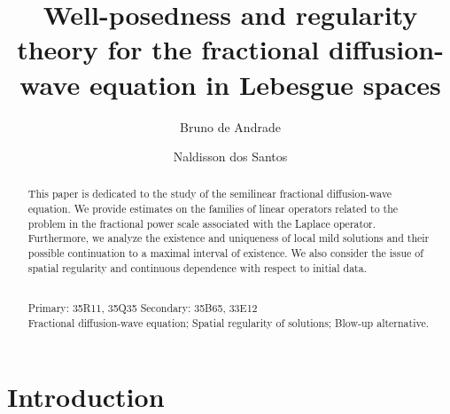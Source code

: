 \documentclass[12pt,reqno]{amsart}
\begin{document}
	
	
	
	\title[ Fractional diffusion-wave equations]{Well-posedness and regularity theory for the fractional diffusion-wave equation in Lebesgue spaces}
	
	
	
	\author[B. de Andrade]{Bruno de Andrade}%
	\address[B. de Andrade]{Departamento de Matem\'atica, Universidade Federal de Sergipe, S\~ao Crist\'ov\~ao-SE, CEP 49100-000, Brazil.}
	\author[N. dos Santos]{Naldisson dos Santos}%
	\address[N. Santos]{Departamento de Matem\'atica, Universidade Federal de Sergipe, S\~ao Crist\'ov\~ao-SE, CEP 49100-000, Brazil.}
	\date{}
	
	
	
	
	\begin{abstract}
		This paper is dedicated to the study of the semilinear fractional diffusion-wave equation. We provide estimates on the families of linear operators related to the problem in the fractional power scale associated with the Laplace operator. Furthermore, we analyze the existence and uniqueness of local mild solutions and their possible continuation to a maximal interval of existence. We also consider the issue of spatial regularity and continuous dependence with respect to initial data. \\
		
		\
		
		 Primary:  35R11, 35Q35 Secondary: 35B65, 33E12\\
		
		 Fractional diffusion-wave equation;   Spatial regularity of solutions;  Blow-up alternative.
		
	\end{abstract}
	
	
	
	\maketitle
	
	
	
	\section{Introduction} \label{intro}
	
\end{document}
